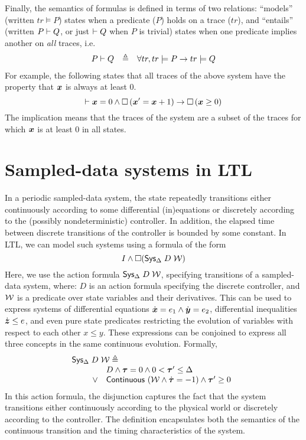 Finally, the semantics of formulas is defined in terms of two relations:
``models'' (written $tr \models P$) states when a predicate ($P$) holds on
a trace ($tr$), and ``entails'' (written $P \vdash Q$, or just $\vdash
Q$ when $P$ is trivial) states when one predicate implies another on
\emph{all} traces, i.e.
\[\begin{array}{rcl}
P \vdash Q & \triangleq & \forall tr, tr \models P \rightarrow tr \models Q
\end{array}
\]
For example, the following states that all traces of the above system have
the property that $\boldsymbol{x}$ is always at least 0.
\[
\vdash \boldsymbol{x} = 0 \wedge \Box{} \left(\boldsymbol{x}^\prime = \boldsymbol{x} + 1\right) \rightarrow \Box{} \left(\boldsymbol{x} \geq 0\right)
\]
The implication means that the traces of the system are a subset of the
traces for which $\boldsymbol{x}$ is at least 0 in all states.

\section{Sampled-data systems in LTL}
In a periodic sampled-data system, the state repeatedly transitions either
continuously according to some differential (in)equations or discretely
according to the (possibly nondeterministic) controller.  In addition, the
elapsed time between discrete transitions of the controller is bounded by
some constant.  In LTL, we can model such systems using a formula of the
form
\[
I\wedge\Box{({\textsf{Sys}}{}_{\Delta}\;D\;\ensuremath{\mathcal{W}})}
\]
Here, we use the action formula ${\textsf{Sys}}{}_{\Delta}\;D\;\mathcal{W}$, specifying
transitions of a sampled-data system, where: $D$ is an action formula
specifying the discrete controller, and $\mathcal{W}$ is a predicate over state
variables and their derivatives. This can be used to express systems of
differential equations $\dot{\boldsymbol{x}} = e_1 \wedge \dot{\boldsymbol{y}} =
e_2$, differential inequalities $\dot{\boldsymbol{z}} \leq e$, and even pure
state predicates restricting the evolution of variables with respect to
each other $x \leq y$. These expressions can be conjoined to express all
three concepts in the same continuous evolution. Formally,
\[\begin{array}{l}
{\textsf{Sys}}{}_{\Delta}\;D\;\mathcal{W} \triangleq \\
\qquad
\begin{array}{cl}
& D \wedge \boldsymbol{\tau} = 0 \wedge 0 < \boldsymbol{\tau}^\prime \leq \Delta \\
\vee & \mathsf{Continuous}\,\left(\mathcal{W} \wedge \dot{\boldsymbol{\tau}} = -1\right) \wedge \boldsymbol{\tau}^\prime \geq 0 \\
\end{array}
\end{array}
\]
In this action formula, the disjunction captures the fact that the system
transitions either continuously according to the physical world or
discretely according to the controller.  The definition encapsulates both
the semantics of the continuous transition and the timing characteristics
of the system.

